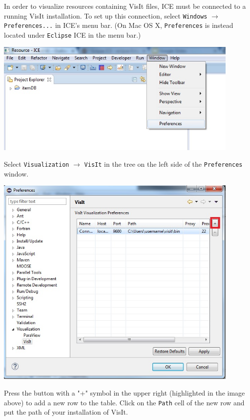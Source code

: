 \documentclass{article}
\begin{document}
In order to visualize resources containing VisIt files, ICE must be connected to
a running VisIt installation. To set up this connection, select \texttt{Windows}
$\rightarrow$ \texttt{Preferences...} in ICE's menu bar. (On Mac OS X,
\texttt{Preferences} is instead located under \texttt{Eclipse} ICE in the menu
bar.)

\begin{center}
\includegraphics[width=12cm]{images/ICEPreferences}
\end{center}

Select \texttt{Visualization} $\rightarrow$ \texttt{VisIt} in the tree on the
left side of the \texttt{Preferences} window.

\begin{center}
\includegraphics[width=12cm]{images/VisualizationPreferences}
\end{center}

Press the button with a "+" symbol in the upper right (highlighted in the image
above) to add a new row to the table. Click on the \texttt{Path} cell of the new
row and put the path of your installation of VisIt.
\end{document}
